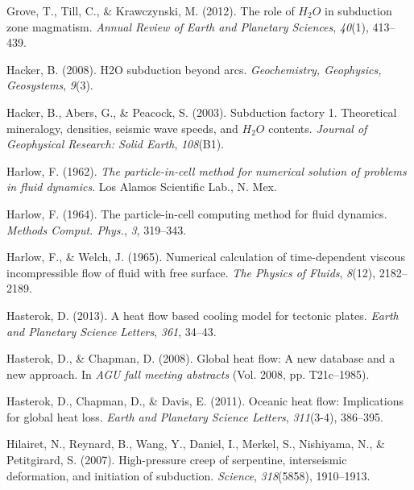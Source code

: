 \begin{CSLReferences}{1}{1}
\leavevmode{}%
Grove, T., Till, C., \& Krawczynski, M. (2012). The role of \(H_2O\) in subduction zone magmatism. \emph{Annual Review of Earth and Planetary Sciences}, \emph{40}(1), 413--439.

\leavevmode{}%
Hacker, B. (2008). H2O subduction beyond arcs. \emph{Geochemistry, Geophysics, Geosystems}, \emph{9}(3).

\leavevmode{}%
Hacker, B., Abers, G., \& Peacock, S. (2003). Subduction factory 1. Theoretical mineralogy, densities, seismic wave speeds, and \(H_2O\) contents. \emph{Journal of Geophysical Research: Solid Earth}, \emph{108}(B1).

\leavevmode{}%
Harlow, F. (1962). \emph{The particle-in-cell method for numerical solution of problems in fluid dynamics}. Los Alamos Scientific Lab., N. Mex.

\leavevmode{}%
Harlow, F. (1964). The particle-in-cell computing method for fluid dynamics. \emph{Methods Comput. Phys.}, \emph{3}, 319--343.

\leavevmode{}%
Harlow, F., \& Welch, J. (1965). Numerical calculation of time-dependent viscous incompressible flow of fluid with free surface. \emph{The Physics of Fluids}, \emph{8}(12), 2182--2189.

\leavevmode{}%
Hasterok, D. (2013). A heat flow based cooling model for tectonic plates. \emph{Earth and Planetary Science Letters}, \emph{361}, 34--43.

\leavevmode{}%
Hasterok, D., \& Chapman, D. (2008). Global heat flow: A new database and a new approach. In \emph{AGU fall meeting abstracts} (Vol. 2008, pp. T21c--1985).

\leavevmode{}%
Hasterok, D., Chapman, D., \& Davis, E. (2011). Oceanic heat flow: Implications for global heat loss. \emph{Earth and Planetary Science Letters}, \emph{311}(3-4), 386--395.

\leavevmode{}%
Hilairet, N., Reynard, B., Wang, Y., Daniel, I., Merkel, S., Nishiyama, N., \& Petitgirard, S. (2007). High-pressure creep of serpentine, interseismic deformation, and initiation of subduction. \emph{Science}, \emph{318}(5858), 1910--1913.


\end{CSLReferences}
